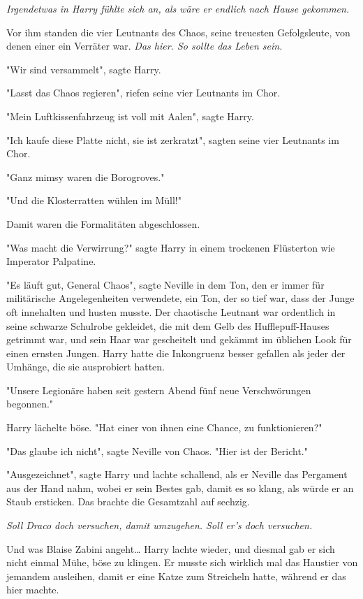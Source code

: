 {\emph{Irgendetwas in Harry fühlte sich an, als wäre er endlich nach Hause gekommen.}

Vor ihm standen die vier Leutnants des Chaos, seine treuesten Gefolgsleute, von denen einer ein Verräter war. \emph{Das hier. So sollte das Leben sein.}

"Wir sind versammelt", sagte Harry.

"Lasst das Chaos regieren", riefen seine vier Leutnants im Chor.

"Mein Luftkissenfahrzeug ist voll mit Aalen", sagte Harry.

"Ich kaufe diese Platte nicht, sie ist zerkratzt", sagten seine vier Leutnants im Chor.

"Ganz mimsy waren die Borogroves."

"Und die Klosterratten wühlen im Müll!"

Damit waren die Formalitäten abgeschlossen.

"Was macht die Verwirrung?" sagte Harry in einem trockenen Flüsterton wie Imperator Palpatine.

"Es läuft gut, General Chaos", sagte Neville in dem Ton, den er immer für militärische Angelegenheiten verwendete, ein Ton, der so tief war, dass der Junge oft innehalten und husten musste. Der chaotische Leutnant war ordentlich in seine schwarze Schulrobe gekleidet, die mit dem Gelb des Hufflepuff-Hauses getrimmt war, und sein Haar war gescheitelt und gekämmt im üblichen Look für einen ernsten Jungen. Harry hatte die Inkongruenz besser gefallen als jeder der Umhänge, die sie ausprobiert hatten.

"Unsere Legionäre haben seit gestern Abend fünf neue Verschwörungen begonnen."

Harry lächelte böse. "Hat einer von ihnen eine Chance, zu funktionieren?"

"Das glaube ich nicht", sagte Neville von Chaos. "Hier ist der Bericht."

"Ausgezeichnet", sagte Harry und lachte schallend, als er Neville das Pergament aus der Hand nahm, wobei er sein Bestes gab, damit es so klang, als würde er an Staub ersticken. Das brachte die Gesamtzahl auf sechzig.

\emph{Soll Draco doch versuchen, damit umzugehen. Soll er's doch versuchen.}

Und was Blaise Zabini angeht… Harry lachte wieder, und diesmal gab er sich nicht einmal Mühe, böse zu klingen. Er musste sich wirklich mal das Haustier von jemandem ausleihen, damit er eine Katze zum Streicheln hatte, während er das hier machte.

}
